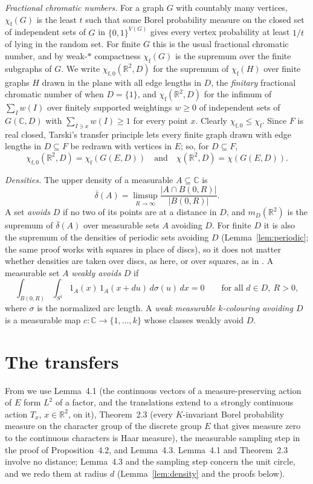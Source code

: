 \documentclass[11pt,a4paper]{amsart}
\theoremstyle{definition}
\theoremstyle{remark}
\newcommand{\C}{\mathbb{C}}
\newcommand{\R}{\mathbb{R}}
\newcommand{\dens}{\overline{\delta}}
\newcommand{\chif}{\chi_{\mathrm f}}
\begin{document}
\emph{Fractional chromatic numbers.} For a graph $G$ with countably many vertices, $\chif(G)$ is the least $t$ such
that some Borel probability measure on the closed set of independent sets of $G$ in $\{0,1\}^{V(G)}$ gives every
vertex probability at least $1/t$ of lying in the random set. For finite $G$ this is the usual fractional chromatic
number, and by weak-$*$ compactness $\chif(G)$ is the supremum over the finite subgraphs of $G$. We write
$\chi_{\mathrm f,0}(\R^2,D)$ for the supremum of $\chif(H)$ over finite graphs $H$ drawn in the plane with all edge
lengths in $D$, the \emph{finitary} fractional chromatic number of \cite{MRVZ} when $D=\{1\}$, and $\chif(\R^2,D)$
for the infimum of $\sum_I w(I)$ over finitely supported weightings $w\ge0$ of independent sets of $G(\C,D)$ with
$\sum_{I\ni x}w(I)\ge1$ for every point $x$. Clearly $\chi_{\mathrm f,0}\le\chif$. Since $F$ is real closed,
Tarski's transfer principle lets every finite graph drawn with edge lengths in $D\subseteq F$ be redrawn with
vertices in $E$; so, for $D\subseteq F$,
\[
\chi_{\mathrm f,0}(\R^2,D)=\chif(G(E,D))\quad\text{and}\quad\chi(\R^2,D)=\chi(G(E,D)).
\]

\emph{Densities.} The upper density of a measurable $A\subseteq\C$ is
\[
\dens(A)=\limsup_{R\to\infty}\frac{|A\cap B(0,R)|}{|B(0,R)|}.
\]
A set \emph{avoids} $D$ if no two of its points are at a
distance in $D$, and $m_D(\R^2)$ is the supremum of $\dens(A)$ over measurable sets $A$ avoiding $D$. For finite $D$
it is also the supremum of the densities of periodic sets avoiding $D$ (Lemma~\ref{lem:periodic}; the same proof
works with squares in place of discs), so it does not matter whether densities are taken over discs, as here, or over
squares, as in \cite{OFV,Bukh}. A measurable set $A$
\emph{weakly avoids} $D$ if
\[
\int_{B(0,R)}\int_{S^1}1_A(x)\,1_A(x+du)\,d\sigma(u)\,dx=0\qquad\text{for all }d\in D,\ R>0,
\]
where $\sigma$ is the normalized arc length. A \emph{weak measurable $k$-colouring avoiding $D$} is a measurable map
$c:\C\to\{1,\dots,k\}$ whose classes weakly avoid $D$.

\section{The transfers}\label{sec:transfer}

From \cite{OpenAI} we use Lemma~4.1 (the continuous vectors of a measure-preserving action of $E$ form $L^2$ of a
factor, and the translations extend to a strongly continuous action $T_x$, $x\in\R^2$, on it), Theorem~2.3 (every
$K$-invariant Borel probability measure on the character group of the discrete group $E$ that gives measure zero to
the continuous characters is Haar measure), the measurable sampling step in the proof of Proposition~4.2, and
Lemma~4.3. Lemma~4.1 and Theorem~2.3 involve no distance; Lemma~4.3 and the sampling step concern the unit circle,
and we redo them at radius $d$ (Lemma~\ref{lem:density} and the proofs below).
\end{document}
